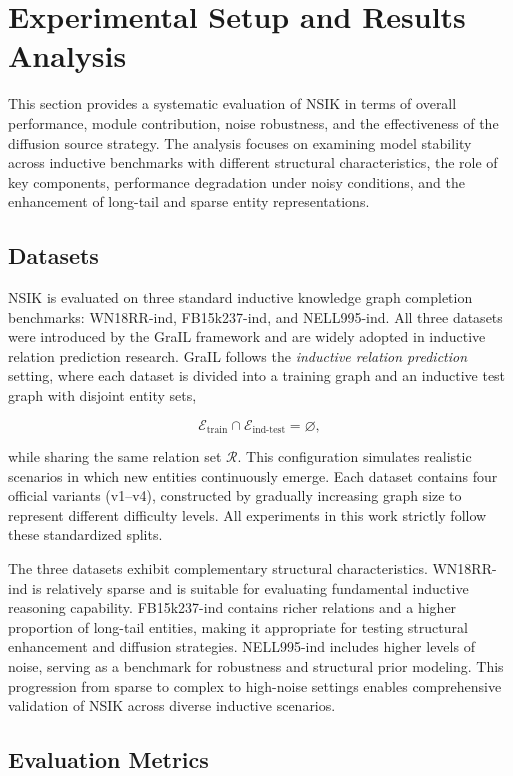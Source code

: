 \documentclass[preprint,12pt]{elsarticle}
\begin{document}
\section{Experimental Setup and Results Analysis}
This section provides a systematic evaluation of NSIK in terms of overall performance, module contribution, noise robustness, and the effectiveness of the diffusion source strategy. The analysis focuses on examining model stability across inductive benchmarks with different structural characteristics, the role of key components, performance degradation under noisy conditions, and the enhancement of long-tail and sparse entity representations.

\subsection{Datasets}

NSIK is evaluated on three standard inductive knowledge graph completion benchmarks: WN18RR-ind, FB15k237-ind, and NELL995-ind. All three datasets were introduced by the GraIL framework \cite{subgraph-inductive-2020} and are widely adopted in inductive relation prediction research. GraIL follows the \emph{inductive relation prediction} setting, where each dataset is divided into a training graph and an inductive test graph with disjoint entity sets,

\[
\mathcal{E}_{\text{train}} \cap \mathcal{E}_{\text{ind-test}} = \varnothing,
\]

while sharing the same relation set $\mathcal{R}$. This configuration simulates realistic scenarios in which new entities continuously emerge. Each dataset contains four official variants (v1--v4), constructed by gradually increasing graph size to represent different difficulty levels. All experiments in this work strictly follow these standardized splits.

The three datasets exhibit complementary structural characteristics. WN18RR-ind is relatively sparse and is suitable for evaluating fundamental inductive reasoning capability. FB15k237-ind contains richer relations and a higher proportion of long-tail entities, making it appropriate for testing structural enhancement and diffusion strategies. NELL995-ind includes higher levels of noise, serving as a benchmark for robustness and structural prior modeling. This progression from sparse to complex to high-noise settings enables comprehensive validation of NSIK across diverse inductive scenarios.

\subsection{Evaluation Metrics}
\end{document}
